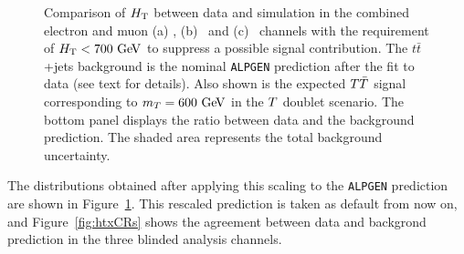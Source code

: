 \begin{figure}[h!tb]\begin{center}
	\caption{Comparison of $\HT$ between data and simulation in the combined
electron and muon (a) \chii, (b) \chiii\ and (c) \chiv\ channels with 
the requirement of $\HT<700\gev$ to suppress a possible signal contribution.
The $t\bar{t}$+jets background is the nominal \texttt{ALPGEN} prediction after the fit to data (see text for details).
Also shown is the expected $\TT$ signal corresponding to $m_{\T}=600\gev$ in the $\T$ doublet scenario.
The bottom panel displays the ratio between data
and the background prediction. The shaded area represents the total background uncertainty.\label{fig:HT_afterfit}}
\end{center}\end{figure}
The distributions obtained after applying this scaling
to the \texttt{ALPGEN} prediction are shown in Figure~\ref{fig:HT_afterfit}.
This rescaled prediction is taken as default from now on, and
Figure~\ref{fig:htxCRs} shows the agreement between data and
backgrond prediction in the three blinded analysis channels.


